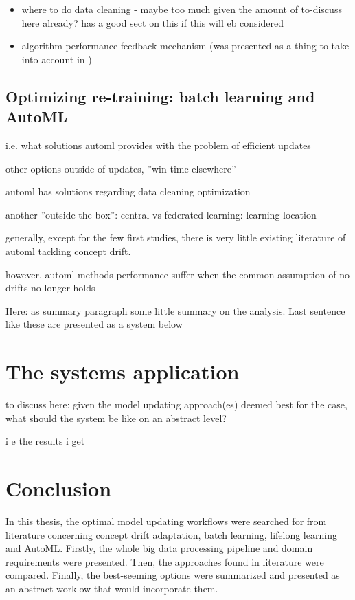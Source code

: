 \begin{itemize}
    \item where to do data cleaning - maybe too much given the amount of to-discuss here already? \cite{mlforstreamingsurvey} has a good sect on this if this will eb considered
    \item algorithm performance feedback mechanism (was presented as a thing to take into account in \cite{streamminingchallenges})
\end{itemize}

\section{Optimizing re-training: batch learning and AutoML}

i.e. what solutions automl provides with the problem of efficient updates

other options outside of updates, ''win time elsewhere''

automl has solutions regarding data cleaning optimization

another ''outside the box'': central vs federated learning: learning location

generally, except for the few first studies, there is very little existing literature of automl tackling concept drift. \cite{celik_adaptation_2021}

however, automl methods performance suffer when the common assumption of no drifts no longer holds \cite{celik_adaptation_2021}

Here: as summary paragraph some little summary on the analysis. Last sentence like these are presented as a system below

\chapter{The systems application}

to discuss here: given the model updating approach(es) deemed best for the case, what should the system be like on an abstract level?

i e the results i get


\chapter{Conclusion}

In this thesis, the optimal model updating workflows were searched for from literature concerning concept drift adaptation, batch learning, lifelong learning and AutoML. Firstly, the whole big data processing pipeline and domain requirements were presented. Then, the approaches found in literature were compared. Finally, the best-seeming options were summarized and presented as an abstract worklow that would incorporate them.


